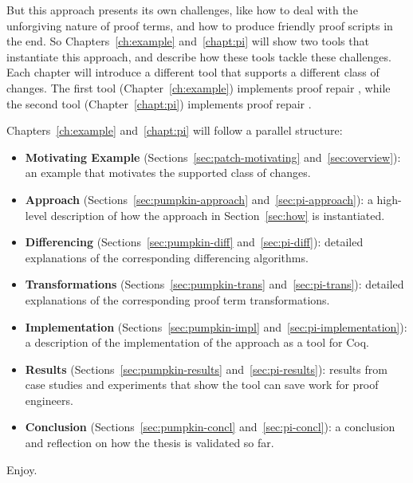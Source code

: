But this approach presents its own challenges,
like how to deal with the unforgiving nature of proof terms,
and how to produce friendly proof scripts in the end.
So Chapters~\ref{ch:example} and~\ref{chapt:pi} will show two tools that instantiate this approach,
and describe how these tools tackle these challenges.
Each chapter will introduce a different tool that supports a different class of changes.
The first tool (Chapter~\ref{ch:example}) implements proof repair ,
while the second tool (Chapter~\ref{chapt:pi}) implements proof repair .

Chapters~\ref{ch:example} and~\ref{chapt:pi} will follow a parallel structure:

\begin{itemize}
\item \textbf{Motivating Example} (Sections~\ref{sec:patch-motivating} and~\ref{sec:overview}):
an example that motivates the supported class of changes. 
\item \textbf{Approach} (Sections~\ref{sec:pumpkin-approach} and~\ref{sec:pi-approach}):
a high-level description of how the approach in Section~\ref{sec:how} is instantiated.
\item \textbf{Differencing} (Sections~\ref{sec:pumpkin-diff} and~\ref{sec:pi-diff}):
detailed explanations of the corresponding differencing algorithms.
\item \textbf{Transformations} (Sections~\ref{sec:pumpkin-trans} and~\ref{sec:pi-trans}):
detailed explanations of the corresponding proof term transformations.
\item \textbf{Implementation} (Sections~\ref{sec:pumpkin-impl} and~\ref{sec:pi-implementation}):
a description of the implementation of the approach as a tool for Coq.
\item \textbf{Results} (Sections~\ref{sec:pumpkin-results} and~\ref{sec:pi-results}):
results from case studies and experiments that show the tool can save work for proof engineers.
\item \textbf{Conclusion} (Sections~\ref{sec:pumpkin-concl} and~\ref{sec:pi-concl}):
a conclusion and reflection on how the thesis is validated so far.
\end{itemize}
Enjoy.

